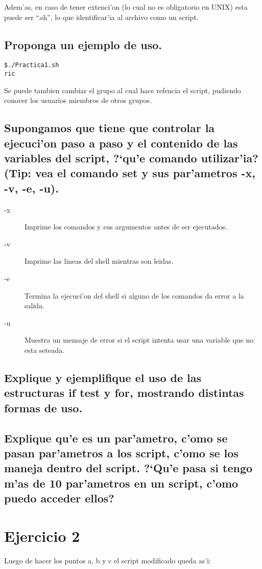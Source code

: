 \documentclass[a4paper,11pt]{article}
\newcommand{\?}{?`}
\begin{document}
Adem'as, en caso de tener extenci'on (lo cual no es obligatorio en UNIX) esta puede ser ``.sh'', lo que identificar'ia al archivo como un script.

\subsection[Punto E]{Proponga un ejemplo de uso.}

\begin{lstlisting}[title=Ejemplo de uso]
$./Practica1.sh
ric
\end{lstlisting}

Se puede tambien cambiar el grupo al cual hace refencia el script, pudiendo conocer los usuarios miembros de otros grupos.

\subsection[Punto F]{Supongamos que tiene que controlar la ejecuci'on paso a paso y el contenido de
las variables del script, \?qu'e comando utilizar'ia? (Tip: vea el comando set y sus
par'ametros -x, -v, -e, -u).}



\begin{description}
 \item [-x] Imprime los comandos y sus argumentos antes de ser ejecutados.
 \item [-v] Imprime las lineas del shell mientras son leidas.
 \item [-e] Termina la ejecuci'on del shell si alguno de los comandos da error a la salida.
 \item [-u] Muestra un mensaje de error si el script intenta usar una variable que no esta seteada.
\end{description}

\subsection[Punto G]{Explique y ejemplifique el uso de las estructuras if test y for, mostrando distintas
formas de uso.}



\subsection[Punto H]{Explique qu'e es un par'ametro, c'omo se pasan par'ametros a los script, c'omo se
los maneja dentro del script. \?Qu'e pasa si tengo m'as de 10 par'ametros en un script, c'omo
puedo acceder ellos?}

\section{Ejercicio 2}

Luego de hacer los puntos a, b y c el script modificado queda as'i:


\end{document}
